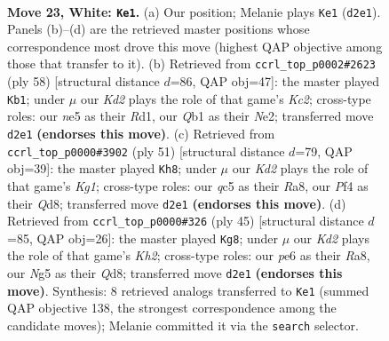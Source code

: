 \documentclass[11pt]{article}
\begin{document}
\clearpage

\begin{figure}[p]\centering
\begin{subfigure}{0.46\textwidth}\centering
\resizebox{\linewidth}{!}{%
\newchessgame
\chessboard[
  setfen={rn1r4/4k3/1p2p3/pPq1npN1/5P1p/8/P2KB1PP/RQ5R w - - 0 23},
  showmover=false,
  pgfstyle=straightmove, color=movearrow, markmove={d2-e1}
]}
\caption{}
\end{subfigure}\hfill
\begin{subfigure}{0.46\textwidth}\centering
\resizebox{\linewidth}{!}{%
\newchessgame
\chessboard[
  setfen={r3r1k1/1pb2ppp/2q3n1/6P1/1p2N2P/1Q2PP2/1PK1N3/3R3R w - - 0 30},
  showmover=false,
  pgfstyle=straightmove, color=movearrow, markmove={c2-b1}
]}
\caption{}
\end{subfigure}
\\[4pt]
\begin{subfigure}{0.46\textwidth}\centering
\resizebox{\linewidth}{!}{%
\newchessgame
\chessboard[
  setfen={r2q1rk1/1b5p/p2p4/1p3pR1/3p4/P1NP2Q1/1P4PP/2R3K1 b - - 0 26},
  showmover=false,
  pgfstyle=straightmove, color=movearrow, markmove={g8-h8}
]}
\caption{}
\end{subfigure}\hfill
\begin{subfigure}{0.46\textwidth}\centering
\resizebox{\linewidth}{!}{%
\newchessgame
\chessboard[
  setfen={r2q1r2/1p1n1ppk/7p/p3PQ2/P1pP4/8/1P4PP/R3NR1K b - - 0 23},
  showmover=false,
  pgfstyle=straightmove, color=movearrow, markmove={h7-g8}
]}
\caption{}
\end{subfigure}
\caption{\textbf{Move 23, White: \texttt{Ke1}.} (a) Our position; Melanie plays \texttt{Ke1} (\texttt{d2e1}). Panels (b)--(d) are the retrieved master positions whose correspondence most drove this move (highest QAP objective among those that transfer to it). (b) Retrieved from \texttt{ccrl\_top\_p0002\#2623} (ply 58) [structural distance $d$=86, QAP obj=47]: the master played \texttt{Kb1}; under $\mu$ our \emph{Kd2} plays the role of that game's \emph{Kc2}; cross-type roles: our \emph{n}e5 as their \emph{R}d1, our \emph{Q}b1 as their \emph{N}e2; transferred move \texttt{d2e1} \textbf{(endorses this move)}. (c) Retrieved from \texttt{ccrl\_top\_p0000\#3902} (ply 51) [structural distance $d$=79, QAP obj=39]: the master played \texttt{Kh8}; under $\mu$ our \emph{Kd2} plays the role of that game's \emph{Kg1}; cross-type roles: our \emph{q}c5 as their \emph{R}a8, our \emph{P}f4 as their \emph{Q}d8; transferred move \texttt{d2e1} \textbf{(endorses this move)}. (d) Retrieved from \texttt{ccrl\_top\_p0000\#326} (ply 45) [structural distance $d$=85, QAP obj=26]: the master played \texttt{Kg8}; under $\mu$ our \emph{Kd2} plays the role of that game's \emph{Kh2}; cross-type roles: our \emph{p}e6 as their \emph{R}a8, our \emph{N}g5 as their \emph{Q}d8; transferred move \texttt{d2e1} \textbf{(endorses this move)}. Synthesis: 8 retrieved analogs transferred to \texttt{Ke1} (summed QAP objective 138, the strongest correspondence among the candidate moves); Melanie committed it via the \texttt{search} selector.}
\label{fig:thought-m44}
\end{figure}
\end{document}
